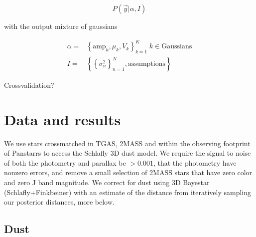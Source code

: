 \documentclass[modern]{aastex61}
\begin{document}
\begin{equation}
\label{eq:xdlikelihood}
P(\vec{y}|\alpha, I)
\end{equation}

with the output mixture of gaussians

\begin{equation}
\label{eq:xd}
\begin{aligned}
\alpha = &\left\{\mathrm{amp}_k, \mu_k, V_k\right\}_{k=1}^K \; k \in \mathrm{Gaussians} \\
I = &\left\{\left\{\sigma^2_n\right\}_{n=1}^N, \mathrm{assumptions}\right\}
\end{aligned}
\end{equation}


Crossvalidation?

\section{Data and results}

We use stars crossmatched in TGAS, 2MASS and within the observing footprint of Panstarrs to access the Schlafly 3D dust model. We require the signal to noise of both the photometry and parallax be $> 0.001$, that the photometry have nonzero errors, and remove a small selection of 2MASS stars that have zero color and zero J band magnitude. We correct for dust using 3D Bayestar (Schlafly+Finkbeiner) with an estimate of the distance from iteratively sampling our posterior distances, more below.

\subsection{Dust}
\end{document}
